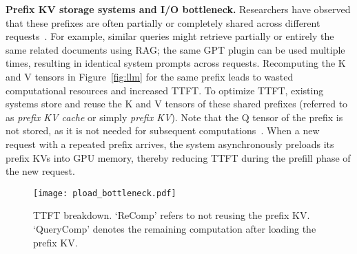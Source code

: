 
\noindent \textbf{Prefix KV storage systems and I/O bottleneck.}
Researchers have observed that these prefixes are often partially or completely shared across different requests~\cite{sglang-arxiv23, chunkattention-arxiv24, cachegen-sigcomm24, ragcache-arxiv24, promptcache-mlsys24, attentionstore-atc24}. For example, similar queries might retrieve partially or entirely the same related documents using RAG; the same GPT plugin can be used multiple times, resulting in identical system prompts across requests. 
Recomputing the K and V tensors in Figure~\ref{fig:llm} for the same prefix leads to wasted computational resources and increased TTFT. To optimize TTFT, existing systems store and reuse the K and V tensors of these shared prefixes (referred to as \textit{prefix KV cache} or simply \textit{prefix KV}). Note that the Q tensor of the prefix is not stored, as it is not needed for subsequent computations~\cite{attentionstore-atc24}. When a new request with a repeated prefix arrives, the system asynchronously preloads its prefix KVs into GPU memory, thereby reducing TTFT during the prefill phase of the new request.


\begin{figure}
	\centering
	\texttt{[image: pload\_bottleneck.pdf]}
	\vspace{-0.1in}
	\caption{TTFT breakdown.
				`ReComp' refers to not reusing the prefix KV. `QueryComp' denotes the remaining computation after loading the prefix KV. }
	\label{fig:pload-bottleneck}
	\vspace{-0.15in}
\end{figure}

